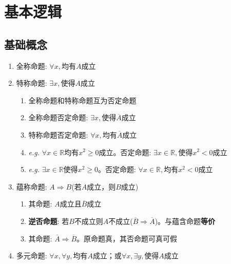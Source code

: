 \documentclass[a4paper,12pt]{article}
\begin{document}



    \section{基本逻辑}

    \subsection{基础概念}

    \begin{enumerate}
        \item 全称命题: $\forall x,$均有$A$成立
        \item 特称命题: $\exists x,$使得$A$成立
        \begin{enumerate}
            \item 全称命题和特称命题互为否定命题
            \item 全称命题否定命题: $\exists x,$使得$\overline{A}$成立
            \item 特称命题否定命题: $\forall x,$均有$\overline{A}$成立
            \item \emph{e.g.} $\forall x \in \mathbb{R}$均有$x^2 \ge 0$成立。否定命题: $\exists x \in \mathbb{R},$使得$x^2 < 0$成立
            \item \emph{e.g.} $\exists x \in \mathbb{R}$使得$x^2 \ge 0$。否定命题: $\forall x \in \mathbb{R},$均有$x^2 < 0$成立
        \end{enumerate}
        \item 蕴称命题: $A \Rightarrow B$(若$A$成立，则$B$成立)
        \begin{enumerate}
            \item 其{\color{red}{否定}}命题: $A$成立且$\overline{B}$成立
            \item \textbf{逆否命题}: 若$B$不成立则$A$不成立($\overline{B} \Rightarrow \overline{A}$)。与蕴含命题\textbf{等价}
            \item 其{\color{red}{否}}命题: $\overline{A} \Rightarrow \overline{B}$。原命题真，其否命题可真可假
        \end{enumerate}
        \item 多元命题: $\forall x, \forall y,$均有$A$成立；或$\forall x, \exists y,$使得$A$成立

\end{enumerate}
\end{document}
